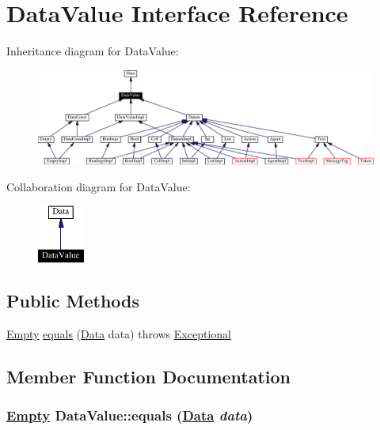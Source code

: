 \hypertarget{interfaceDataValue}{
\section{Data\-Value  Interface Reference}
\label{interfaceDataValue}
}
Inheritance diagram for Data\-Value:\begin{figure}[H]
\begin{center}
\leavevmode
\includegraphics[width=400pt]{interfaceDataValue__inherit__graph}
\end{center}
\end{figure}
Collaboration diagram for Data\-Value:\begin{figure}[H]
\begin{center}
\leavevmode
\includegraphics[width=44pt]{interfaceDataValue__coll__graph}
\end{center}
\end{figure}
\subsection*{Public Methods}
\begin{CompactItemize}
\item 
\hyperlink{interfaceEmpty}{Empty} \hyperlink{interfaceDataValue_a0}{equals} (\hyperlink{interfaceData}{Data} data) throws \hyperlink{classExceptional}{Exceptional}
\end{CompactItemize}


\subsection{Member Function Documentation}
\hypertarget{interfaceDataValue_a0}{
\subsubsection[equals]{\setlength{\rightskip}{0pt plus 5cm}\hyperlink{interfaceEmpty}{Empty} Data\-Value::equals (\hyperlink{interfaceData}{Data} {\em data})}}
\label{interfaceDataValue_a0}




